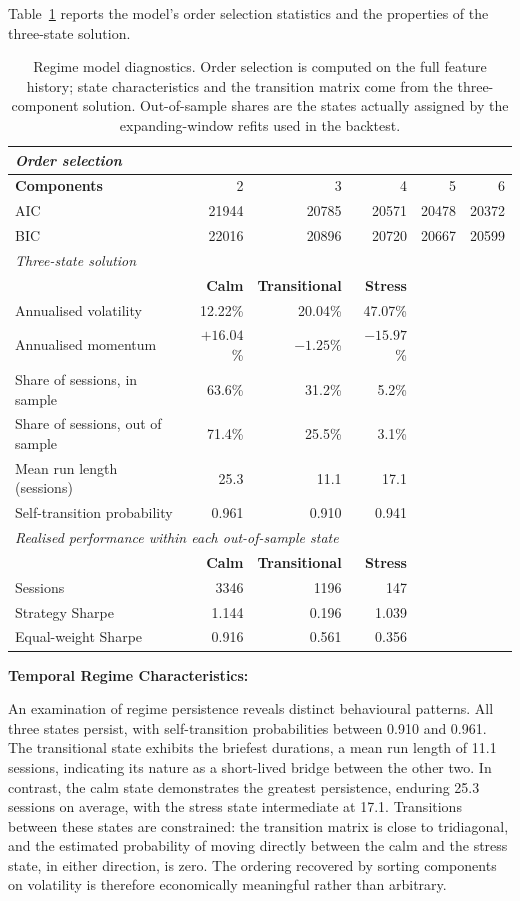 \documentclass{singlecol-new}
\theoremstyle{TH}{
\newtheorem{lemma}{Lemma}
\newtheorem{theorem}[lemma]{Theorem}
\newtheorem{corrolary}[lemma]{Corrolary}
\newtheorem{conjecture}[lemma]{Conjecture}
\newtheorem{proposition}[lemma]{Proposition}
\newtheorem{claim}[lemma]{Claim}
\newtheorem{stheorem}[lemma]{Wrong Theorem}
\newtheorem{algorithm}{Algorithm}
}
\theoremstyle{THrm}{
\newtheorem{definition}{Definition}[section]
\newtheorem{question}{Question}[section]
\newtheorem{remark}{Remark}
\newtheorem{scheme}{Scheme}
}
\theoremstyle{THhit}{
\newtheorem{case}{Case}[section]
}
\begin{document}
Table~\ref{tab:regimefit} reports the model's order selection statistics and the
properties of the three-state solution.

\begin{table}[!ht]
\centering
\caption{Regime model diagnostics. Order selection is computed on the full feature
history; state characteristics and the transition matrix come from the three-component
solution. Out-of-sample shares are the states actually assigned by the expanding-window
refits used in the backtest.}
\label{tab:regimefit}
\footnotesize
\begin{tabular}{p{3.2cm}rrrrr}
\hline
\multicolumn{6}{l}{\textit{Order selection}} \\
\hline
\textbf{Components} & 2 & 3 & 4 & 5 & 6 \\
AIC & 21944 & 20785 & 20571 & 20478 & 20372 \\
BIC & 22016 & 20896 & 20720 & 20667 & 20599 \\
\hline
\multicolumn{6}{l}{\textit{Three-state solution}} \\
\hline
& \textbf{Calm} & \textbf{Transitional} & \textbf{Stress} & & \\
Annualised volatility & 12.22\% & 20.04\% & 47.07\% & & \\
Annualised momentum & $+16.04$\% & $-1.25$\% & $-15.97$\% & & \\
Share of sessions, in sample & 63.6\% & 31.2\% & 5.2\% & & \\
Share of sessions, out of sample & 71.4\% & 25.5\% & 3.1\% & & \\
Mean run length (sessions) & 25.3 & 11.1 & 17.1 & & \\
Self-transition probability & 0.961 & 0.910 & 0.941 & & \\
\hline
\multicolumn{6}{l}{\textit{Realised performance within each out-of-sample state}} \\
\hline
& \textbf{Calm} & \textbf{Transitional} & \textbf{Stress} & & \\
Sessions & 3346 & 1196 & 147 & & \\
Strategy Sharpe & 1.144 & 0.196 & 1.039 & & \\
Equal-weight Sharpe & 0.916 & 0.561 & 0.356 & & \\
\hline
\end{tabular}
\end{table}

\textbf{Temporal Regime Characteristics:}

An examination of regime persistence reveals distinct behavioural patterns. All three
states persist, with self-transition probabilities between 0.910 and 0.961. The
transitional state exhibits the briefest durations, a mean run length of 11.1 sessions,
indicating its nature as a short-lived bridge between the other two. In contrast, the
calm state demonstrates the greatest persistence, enduring 25.3 sessions on average, with
the stress state intermediate at 17.1. Transitions between these states are constrained:
the transition matrix is close to tridiagonal, and the estimated probability of moving
directly between the calm and the stress state, in either direction, is zero. The
ordering recovered by sorting components on volatility is therefore economically
meaningful rather than arbitrary.
\end{document}
